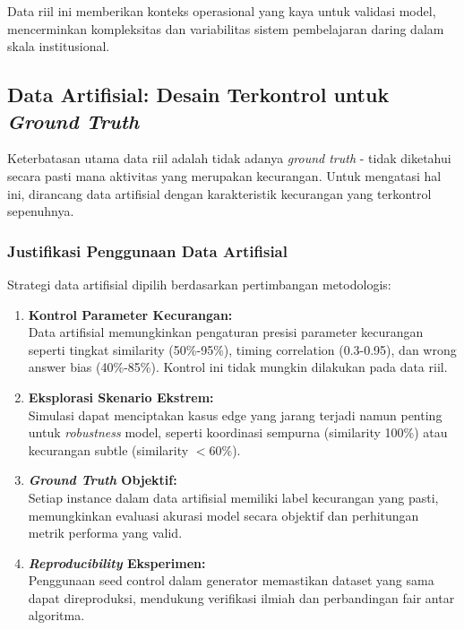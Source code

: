 Data riil ini memberikan konteks operasional yang kaya untuk validasi model, mencerminkan kompleksitas dan variabilitas sistem pembelajaran daring dalam skala institusional.

\subsection{Data Artifisial: Desain Terkontrol untuk \textit{Ground Truth}}
\label{sec:dataArtifisial}

Keterbatasan utama data riil adalah tidak adanya \textit{ground truth} - tidak diketahui secara pasti mana aktivitas yang merupakan kecurangan. Untuk mengatasi hal ini, dirancang data artifisial dengan karakteristik kecurangan yang terkontrol sepenuhnya.

\subsubsection{Justifikasi Penggunaan Data Artifisial}
\label{sec:justifikasiDataArtifisial}

Strategi data artifisial dipilih berdasarkan pertimbangan metodologis:

\begin{enumerate}
    \item \textbf{Kontrol Parameter Kecurangan:} \\
    Data artifisial memungkinkan pengaturan presisi parameter kecurangan seperti tingkat similarity (50\%-95\%), timing correlation (0.3-0.95), dan wrong answer bias (40\%-85\%). Kontrol ini tidak mungkin dilakukan pada data riil.
    
    \item \textbf{Eksplorasi Skenario Ekstrem:} \\
    Simulasi dapat menciptakan kasus edge yang jarang terjadi namun penting untuk \textit{robustness} model, seperti koordinasi sempurna (similarity 100\%) atau kecurangan subtle (similarity $<60\%$).
    
    \item \textbf{\textit{Ground Truth} Objektif:} \\
    Setiap instance dalam data artifisial memiliki label kecurangan yang pasti, memungkinkan evaluasi akurasi model secara objektif dan perhitungan metrik performa yang valid.
    
    \item \textbf{\textit{Reproducibility} Eksperimen:} \\
    Penggunaan seed control dalam generator memastikan dataset yang sama dapat direproduksi, mendukung verifikasi ilmiah dan perbandingan fair antar algoritma.
\end{enumerate}


